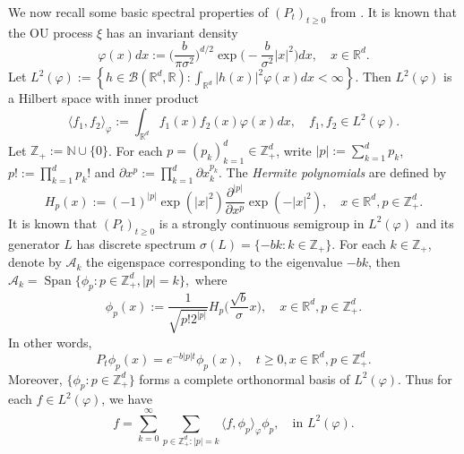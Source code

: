 \documentclass[12pt,a4paper]{amsart}
\theoremstyle{plain}
\theoremstyle{definition}
\numberwithin{equation}{section}
\begin{document}
    We now recall some basic spectral properties of $(P_t)_{t\geq 0}$ from \cite{MetafunePallaraPriola2002Spectrum}.
       It is known that the OU process $\xi$ has an invariant density
\begin{equation}
\label{invariantdensity}
    \varphi(x)dx
    :=\Big (\frac{b}{\pi \sigma^2}\Big )^{d/2}\exp \Big(-\frac{b}{\sigma^2}|x|^2 \Big)dx,
    \quad x\in \mathbb R^d.
\end{equation}
    Let $L^2(\varphi):= \left\{ h  \in \mathcal B(\mathbb R^d, \mathbb R): \int_{\mathbb R^d} |h(x)|^2 \varphi(x) dx < \infty \right\}$.
        Then $L^2(\varphi)$ is a Hilbert space with inner product
\begin{equation}
    \langle f_1, f_2 \rangle_{\varphi}
    := \int_{\mathbb R^d}f_1(x)f_2(x)\varphi(x) dx, \quad f_1,f_2 \in L^2(\varphi).
\end{equation}
       Let $\mathbb Z_+ := \mathbb N\cup\{0\}$.
    For each $p = (p_k)_{k = 1}^d \in \mathbb{Z}_+^{d}$, write $|p|:=\sum_{k=1}^d p_k$,
    $p!:= \prod_{k= 1}^d p_k!$ and $\partial x^p:= \prod_{k = 1}^d\partial x_k^{p_k}$.
    The \emph{Hermite polynomials} are defined by
\begin{equation}
    H_p(x)
    :=(-1)^{|p|}\exp(|x|^2) \frac{\partial ^{|p|}}{\partial x^p} \exp(-|x|^2) ,
    \quad x\in \mathbb R^d,
    p \in \mathbb{Z}_+^{d}.
\end{equation}
It is known that $(P_t)_{t\geq 0}$
       is a strongly continuous semigroup in $L^2(\varphi)$ and its generator $L$ has discrete spectrum
        $\sigma(L)= \{-bk: k \in \mathbb Z_+\}$.
    For each $k \in \mathbb Z_+$, denote by $\mathcal{A}_k$ the eigenspace corresponding to the eigenvalue $-bk$, then
$
    \mathcal{A}_k
    = \operatorname{Span} \{\phi_p : p\in \mathbb Z_+^d, |p|=k\},
$
    where
\begin{equation}\label{eigenfunction}
    \phi_p(x)
        := \frac{1}{\sqrt{ p! 2^{|p|} }} H_p \Big(\frac{ \sqrt{b} }{\sigma}x \Big),
    \quad x\in \mathbb R^d, p\in \mathbb Z_+^d.
\end{equation}
       In other words,
\begin{equation}
    P_t\phi_p(x)
    =e^{-b|p|t}\phi_p(x),
    \quad t\geq 0, x\in \mathbb R^d, p\in \mathbb Z_+^d.
\end{equation}
    Moreover, $\{\phi_p: p \in \mathbb Z_+^d\}$ forms a complete orthonormal basis of $L^2(\varphi)$.
    Thus for each $f\in L^2(\varphi)$, we have
\begin{equation}\label{semicomp1}
    f
         =\sum_{k=0}^{\infty}\sum_{p\in \mathbb Z_+^d:|p|=k}\langle f, \phi_p \rangle_{\varphi} \phi_p,
    \quad \text{in~} L^2(\varphi).
\end{equation}
\end{document}

